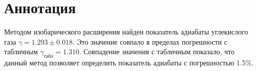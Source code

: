 \chapter*{Аннотация}

Методом изобарического расширения найден показатель адиабаты  углекислого газа $\gamma = 1.293 \pm 0.018$. Это значение совпало в пределах погрешности с табличным $\gamma_\text{табл} = 1.310$. Совпадение значения с табличным показало, что данный метод позволяет определить показатель адиабаты с погрешностью 1.5\%.